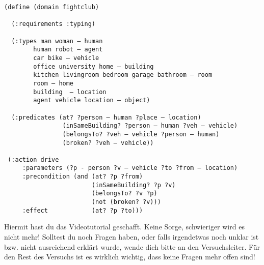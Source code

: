 \documentclass[koma,DIV=1,BCOR=1mm]{article}
\begin{document}
\begin{verbatim}
(define (domain fightclub)

  (:requirements :typing)

  (:types man woman – human
        human robot – agent 
        car bike – vehicle
        office university home – building
        kitchen livingroom bedroom garage bathroom – room
        room – home 
        building  – location 
        agent vehicle location – object)

  (:predicates (at? ?person – human ?place – location)
                (inSameBuilding? ?person – human ?veh – vehicle)
                (belongsTo? ?veh – vehicle ?person – human)
                (broken? ?veh – vehicle))

 (:action drive
     :parameters (?p - person ?v – vehicle ?to ?from – location)
     :precondition (and (at? ?p ?from)
                        (inSameBuilding? ?p ?v)
                        (belongsTo? ?v ?p)                                      
                        (not (broken? ?v)))
     :effect            (at? ?p ?to)))
\end{verbatim}

Hiermit hast du das Videotutorial geschafft. Keine Sorge, schwieriger
wird es nicht mehr! Solltest du noch Fragen haben, oder falls
irgendetwas noch unklar ist bzw. nicht ausreichend erklärt wurde,
wende dich bitte an den Versuchsleiter. Für den Rest des Versuchs ist
es wirklich wichtig, dass keine Fragen mehr offen sind!
\end{document}
